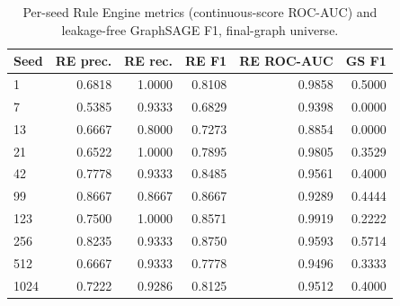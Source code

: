\begin{table}[t]
\centering
\caption{Per-seed Rule Engine metrics (continuous-score ROC-AUC) and leakage-free GraphSAGE F1, final-graph universe.}
\label{tab:perseedfull}
{\small
\begin{tabular}{lrrrrr}
\toprule
Seed & RE prec. & RE rec. & RE F1 & RE ROC-AUC & GS F1 \\
\midrule
1 & 0.6818 & 1.0000 & 0.8108 & 0.9858 & 0.5000 \\
7 & 0.5385 & 0.9333 & 0.6829 & 0.9398 & 0.0000 \\
13 & 0.6667 & 0.8000 & 0.7273 & 0.8854 & 0.0000 \\
21 & 0.6522 & 1.0000 & 0.7895 & 0.9805 & 0.3529 \\
42 & 0.7778 & 0.9333 & 0.8485 & 0.9561 & 0.4000 \\
99 & 0.8667 & 0.8667 & 0.8667 & 0.9289 & 0.4444 \\
123 & 0.7500 & 1.0000 & 0.8571 & 0.9919 & 0.2222 \\
256 & 0.8235 & 0.9333 & 0.8750 & 0.9593 & 0.5714 \\
512 & 0.6667 & 0.9333 & 0.7778 & 0.9496 & 0.3333 \\
1024 & 0.7222 & 0.9286 & 0.8125 & 0.9512 & 0.4000 \\
\bottomrule
\end{tabular}
}
\end{table}
